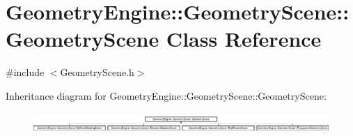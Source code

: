 \hypertarget{class_geometry_engine_1_1_geometry_scene_1_1_geometry_scene}{}\section{Geometry\+Engine\+::Geometry\+Scene\+::Geometry\+Scene Class Reference}
\label{class_geometry_engine_1_1_geometry_scene_1_1_geometry_scene}


{\ttfamily \#include $<$Geometry\+Scene.\+h$>$}

Inheritance diagram for Geometry\+Engine\+::Geometry\+Scene\+::Geometry\+Scene\+:\begin{figure}[H]
\begin{center}
\leavevmode
\includegraphics[height=0.750670cm]{class_geometry_engine_1_1_geometry_scene_1_1_geometry_scene}
\end{center}
\end{figure}
